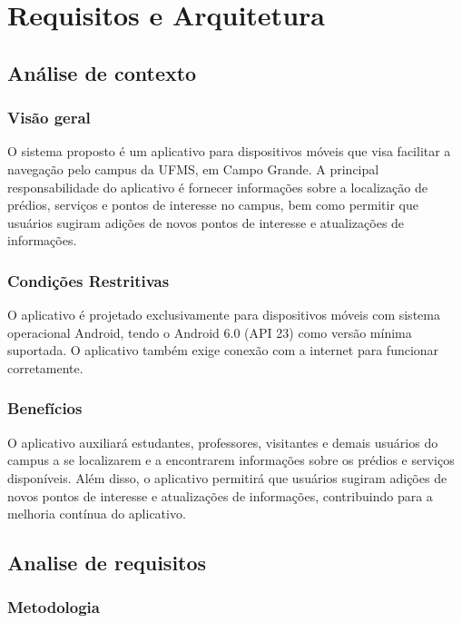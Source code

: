 \section{Requisitos e Arquitetura}
\label{sec:arquitetura}

\subsection{Análise de contexto}

\subsubsection{Visão geral}

    O sistema proposto é um aplicativo para dispositivos móveis que visa facilitar a navegação pelo campus da UFMS, em Campo Grande.  A principal responsabilidade do aplicativo é fornecer informações sobre a localização de prédios, serviços e pontos de interesse no campus, bem como permitir que usuários sugiram adições de novos pontos de interesse e atualizações de informações.

\subsubsection{Condições Restritivas}

    O aplicativo é projetado exclusivamente para dispositivos móveis com sistema operacional Android, tendo o Android 6.0 (API 23) como versão mínima suportada. O aplicativo também exige conexão com a internet para funcionar corretamente.

\subsubsection{Benefícios}

    O aplicativo auxiliará estudantes, professores, visitantes e demais usuários do campus a se localizarem e a encontrarem informações sobre os prédios e serviços disponíveis. Além disso, o aplicativo permitirá que usuários sugiram adições de novos pontos de interesse e atualizações de informações, contribuindo para a melhoria contínua do aplicativo.

\subsection{Analise de requisitos}

\subsubsection{Metodologia}

